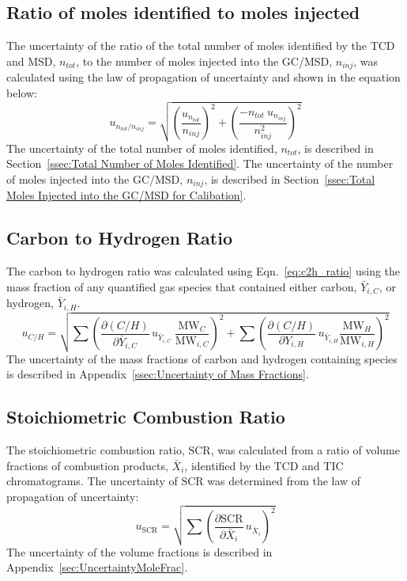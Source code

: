 \documentclass[12pt]{article}
\begin{document}
\subsection{Ratio of moles identified to moles injected }
\label{ssec:mole ratio}
The uncertainty of the ratio of the total number of moles identified by the TCD and MSD, $n_{tot}$, to the number of moles injected into the GC/MSD, $n_{inj}$, was calculated using the law of propagation of uncertainty and shown in the equation below:
\begin{equation}
\label{eq:mol_ratio_uncertainty}
u_{\scriptscriptstyle n_{tot}/n_{inj}} = \sqrt{\left(\frac{u_{\scriptscriptstyle n_{tot}}}{n_{inj}}\right)^2 + \left(\frac{-n_{tot}~u_{\scriptscriptstyle n_{inj}}}{{n_{inj}^2}}\right)^2}
\end{equation}
The uncertainty of the total number of moles identified, $n_{tot}$, is described in Section~\ref{ssec:Total Number of Moles Identified}. The uncertainty of the number of moles injected into the GC/MSD, $n_{inj}$, is described in Section~\ref{ssec:Total Moles Injected into the GC/MSD for Calibation}.

\subsection{Carbon to Hydrogen Ratio}
\label{ssec:C2H_ratio}
The carbon to hydrogen ratio was calculated using Eqn.~\ref{eq:c2h_ratio} using the mass fraction of any quantified gas species that contained either carbon, $\bar{Y}_{i,C}$, or hydrogen, $\bar{Y}_{i,H}$.
\begin{equation}
\label{eq:c2h_uncertainty}
u_{\scriptscriptstyle {C}/{H}} = \sqrt{{\sum\left(\frac{\partial ({C}/{H})}{\partial \bar{Y}_{i,C}}\,u_{\scriptscriptstyle \bar{Y}_{i,C}}~{\frac{\textrm{MW}_{C}}{\textrm{MW}_{i,C}}} \right)}^2+{\sum\left(\frac{\partial ({C}/{H})}{\partial Y_{i,H}}\,u_{\scriptscriptstyle \bar{Y}_{i,H}}{\frac{\textrm{MW}_{H}}{\textrm{MW}_{i,H}}} \right)}^2}
\end{equation}
The uncertainty of the mass fractions of carbon and hydrogen containing species is described in Appendix~\ref{ssec:Uncertainty of Mass Fractions}.

\subsection{Stoichiometric Combustion Ratio}
\label{ssec:Pro_ratio}
The stoichiometric combustion ratio, $\text{SCR}$, was calculated from a ratio of volume fractions of combustion products, $\bar{X}_{i}$, identified by the TCD and TIC chromatograms. The uncertainty of $\text{SCR}$ was determined from the law of propagation of uncertainty:
\begin{equation}
\label{eq:c2h_ratio_uncertainty}
u_{\scriptscriptstyle \text{SCR}} = \sqrt{{\sum\left(\frac{\partial \text{SCR}}{\partial \bar{X}_{i}}\,u_{\scriptscriptstyle \bar{X}_{i}}\right)}^2}
\end{equation}
The uncertainty of the volume fractions is described in Appendix~\ref{sec:UncertaintyMoleFrac}.
\end{document}
